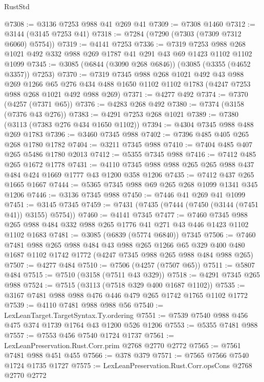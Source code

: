 \begin{lexlean}{RustStd}
\begin{coremodule}
@7308 := @3136 @7253 @988 @41 @269 @41
@7309 := @7308 @1460
@7312 := @3144 (@3145 @7253 @41)
@7318 := @7284 (@7290 (@7303 (@7309 @7312 @6060) @5754))
@7319 := @4141 @7253
@7336 := @7319
    @7253
    @988
    @268
    @1021
    @492
    @332
    @988
    @269
    @1787
    @41
    @291
    @43
    @69
    @1423
    @1102
    @1102
    @1099
@7345 := @3085 (@6844 (@3090 @268 @6846)) (@3085 (@3355 (@4652 @3357)) @7253)
@7370 := @7319
    @7345
    @988
    @268
    @1021
    @492
    @43
    @988
    @269
    @1266
    @65
    @276
    @434
    @488
    @1650
    @1102
    @1102
    @1783
    (@4247 @7253 @988 @268 @1021 @492 @988 @269)
@7371 := @4277 @492
@7374 := @7370 (@4257 (@7371 @65))
@7376 := @4283 @268 @492
@7380 := @7374 (@3158 (@7376 @43 @276))
@7383 := @4291 @7253 @268 @1021
@7389 := @7380 (@3113 (@7383 @276 @434 @1650 @1102))
@7394 := @4304 @7345 @988 @488 @269 @1783
@7396 := @3460 @7345 @988
@7402 := @7396 @485 @405 @265 @268 @1780 @1782
@7404 := @3211 @7345 @988
@7410 := @7404 @485 @407 @265 @5486 @1780 @2013
@7412 := @5355 @7345 @988
@7416 := @7412 @485 @265 @1672 @1778
@7431 := @4110 @7345 @988 @988 @265 @265 @988 @437 @484 @424 @1669 @1777 @43 @1200 @358 @1206
@7435 := @7412 @437 @265 @1665 @1667
@7444 := @5365 @7345 @988 @69 @265 @268 @1099 @1341 @345 @1206
@7446 := @3136 @7345 @988
@7450 := @7446 @41 @269 @41 @1099
@7451 := @3145 @7345
@7459 := @7431 (@7435 (@7444 (@7450 (@3144 (@7451 @41)) @3155) @5754))
@7460 := @4141 @7345
@7477 := @7460
    @7345
    @988
    @265
    @988
    @484
    @332
    @988
    @265
    @1776
    @41
    @271
    @43
    @446
    @1423
    @1102
    @1102
    @1683
@7481 := @3085 (@6839 (@5774 @6840)) @7345
@7506 := @7460
    @7481
    @988
    @265
    @988
    @484
    @43
    @988
    @265
    @1266
    @65
    @329
    @400
    @480
    @1687
    @1102
    @1742
    @1772
    (@4247 @7345 @988 @265 @988 @484 @988 @265)
@7507 := @4277 @484
@7510 := @7506 (@4257 (@7507 @65))
@7511 := @5807 @484
@7515 := @7510 (@3158 (@7511 @43 @329))
@7518 := @4291 @7345 @265 @988
@7524 := @7515 (@3113 (@7518 @329 @400 @1687 @1102))
@7535 := @3167 @7481 @988 @988 @476 @446 @479 @265 @1742 @1765 @1102 @1772
@7539 := @4110 @7481 @988 @988 @56
@7540 := LexLeanTarget.TargetSyntax.Ty.ordering
@7551 := @7539 @7540 @988 @456 @475 @374 @1739 @1764 @43 @1200 @526 @1206
@7553 := @5355 @7481 @988
@7557 := @7553 @456 @7540 @1724 @1737
@7561 := LexLeanPreservation.Rust.Corr.prim @2768 @2770 @2772
@7565 := @7561 @7481 @988 @451 @455
@7566 := @378 @379
@7571 := @7565 @7566 @7540 @1724 @1735 @1727
@7575 := LexLeanPreservation.Rust.Corr.opsCons @2768 @2770 @2772

\end{coremodule}
\end{lexlean}
